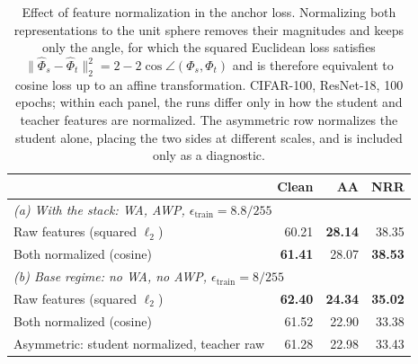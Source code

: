 \documentclass{article} %
\theoremstyle{plain}
\begin{document}
\begin{table}[!htbp]
  \centering \small \setlength{\tabcolsep}{4.5pt}
  \caption{Effect of feature normalization in the anchor loss. Normalizing both representations to
  the unit sphere removes their magnitudes and keeps only the angle, for which the squared Euclidean
  loss satisfies $\lVert \hat\Phi_s - \hat\Phi_t \rVert_2^2 = 2 - 2\cos\angle(\Phi_s, \Phi_t)$ and is
  therefore equivalent to cosine loss up to an affine transformation. CIFAR-100, ResNet-18, 100
  epochs; within each panel, the runs differ only in how the student and teacher features are
  normalized. The asymmetric row normalizes the student alone, placing the two sides at different
  scales, and is included only as a diagnostic.}
  \label{tab:normalization}
  \begin{tabular}{lrrr}
    \toprule
    & Clean & AA & NRR \\
    \midrule
    \multicolumn{4}{l}{\emph{(a) With the stack: WA, AWP, $\epsilon_{\mathrm{train}} = 8.8/255$}} \\
    Raw features (squared $\ell_2$)            & 60.21 & \textbf{28.14} & 38.35 \\
    Both normalized (cosine)                   & \textbf{61.41} & 28.07 & \textbf{38.53} \\
    \midrule
    \multicolumn{4}{l}{\emph{(b) Base regime: no WA, no AWP, $\epsilon_{\mathrm{train}} = 8/255$}} \\
    Raw features (squared $\ell_2$)            & \textbf{62.40} & \textbf{24.34} & \textbf{35.02} \\
    Both normalized (cosine)                   & 61.52 & 22.90 & 33.38 \\
    Asymmetric: student normalized, teacher raw & 61.28 & 22.98 & 33.43 \\
    \bottomrule
  \end{tabular}
\end{table}
\end{document}
